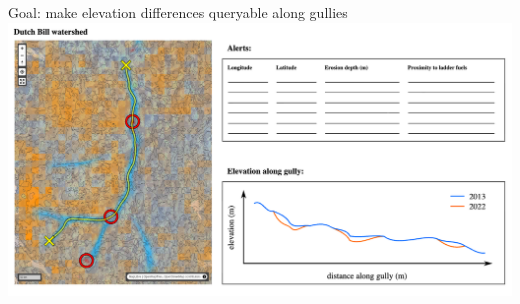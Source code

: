 \documentclass[aspectratio=169]{beamer}
\begin{document}
\begin{frame}{Goal: make elevation differences queryable along gullies}
\vspace{0.35 cm}
\includegraphics[width=\linewidth]{img/crowded-map-sketch.png}
\end{frame}
\end{document}
